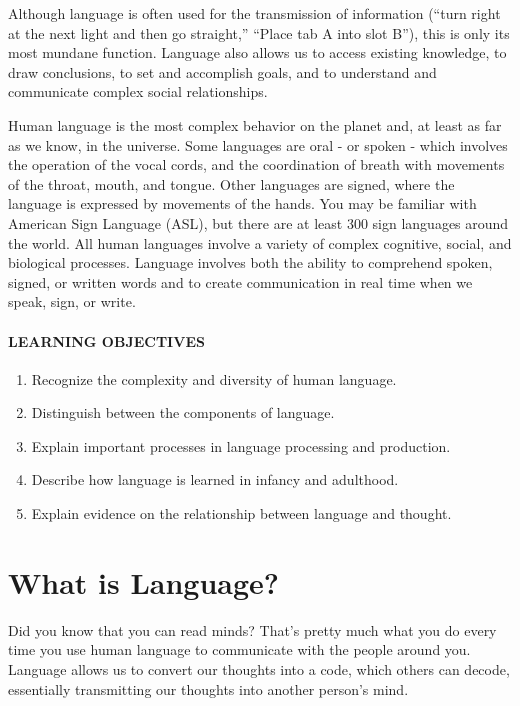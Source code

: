\documentclass[
]{krantz}
\providecommand{\tightlist}{%
  \setlength{\itemsep}{0pt}\setlength{\parskip}{0pt}}
\begin{document}
Although language is often used for the transmission of information (``turn right at the next light and then go straight,'' ``Place tab A into slot B''), this is only its most mundane function. Language also allows us to access existing knowledge, to draw conclusions, to set and accomplish goals, and to understand and communicate complex social relationships.

Human language is the most complex behavior on the planet and, at least as far as we know, in the universe. Some languages are oral - or spoken - which involves the operation of the vocal cords, and the coordination of breath with movements of the throat, mouth, and tongue. Other languages are signed, where the language is expressed by movements of the hands. You may be familiar with American Sign Language (ASL), but there are at least 300 sign languages around the world. All human languages involve a variety of complex cognitive, social, and biological processes. Language involves both the ability to comprehend spoken, signed, or written words and to create communication in real time when we speak, sign, or write.

\hypertarget{learning-objectives-7}{%
\paragraph*{LEARNING OBJECTIVES}\label{learning-objectives-7}}

\begin{enumerate}
\def\labelenumi{\arabic{enumi}.}
\tightlist
\item
  Recognize the complexity and diversity of human language.
\item
  Distinguish between the components of language.
\item
  Explain important processes in language processing and production.
\item
  Describe how language is learned in infancy and adulthood.
\item
  Explain evidence on the relationship between language and thought.
\end{enumerate}

\hypertarget{what-is-language}{%
\section{What is Language?}\label{what-is-language}}

Did you know that you can read minds? That's pretty much what you do every time you use human language to communicate with the people around you. Language allows us to convert our thoughts into a code, which others can decode, essentially transmitting our thoughts into another person's mind.
\end{document}

